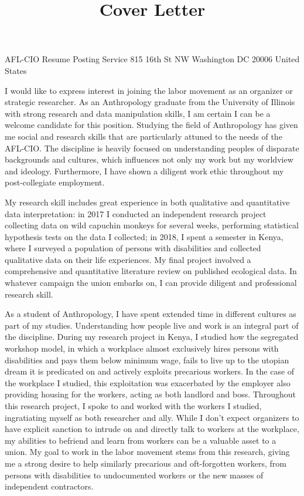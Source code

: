 
\title{Cover Letter}

\maketitle

\newcommand{\employer}{the AFL-CIO}

\toaddress
	{AFL-CIO}
	{Resume Posting Service}
	{815 16th St NW}
	{Washington}
	{DC}
	{20006}
	{United States}
	
I would like to express interest in joining the labor movement as
an organizer or strategic researcher. As an Anthropology graduate from
the University of Illinois with strong research and data manipulation
skills, I am certain I can be a welcome candidate for this position.
Studying the field of Anthropology has given me 
social and research skills that
are particularly attuned to the needs of \employer.
The discipline is heavily focused on understanding peoples of disparate
backgrounds and cultures, which influences not only my work but my worldview and
ideology. Furthermore, I have shown a diligent work ethic throughout
my post-collegiate employment.

My research skill includes great
experience in both qualitative and quantitative data interpretation: in 2017
I conducted an independent research project collecting data on wild
capuchin monkeys for several weeks, performing statistical hypothesis
tests on the data I collected; in 2018, I spent a semester in Kenya, where
I surveyed a population of persons with disabilities and collected qualitative
data on their life experiences. My final project involved a comprehensive
and quantitative literature review on published ecological data.
In whatever campaign the union embarks on, I can provide
diligent and professional research skill.

As a student of Anthropology, I have spent extended time in different
cultures as part of my studies. Understanding how people live and work
is an integral part of the discipline. During my research project in Kenya,
I studied how the segregated workshop model, in which
a workplace almost exclusively hires persons with disabilities
and pays them below minimum wage, fails to live up to the utopian dream
it is predicated on and actively exploits precarious workers.
In the case of the workplace I studied, this exploitation was
exacerbated by the employer also providing housing for the workers,
acting as both landlord and boss.
Throughout this research project, I spoke to and worked
with the workers I studied, ingratiating myself as both
researcher and ally. While I don't expect organizers to
have explicit sanction to intrude on and directly talk
to workers at the workplace, my abilities to befriend
and learn from workers can be a valuable asset to a union.
My goal to work in the labor movement stems from this
research, giving me a strong desire to
help similarly precarious and oft-forgotten workers,
from persons with disabilities
to undocumented workers or the new masses of independent contractors.

